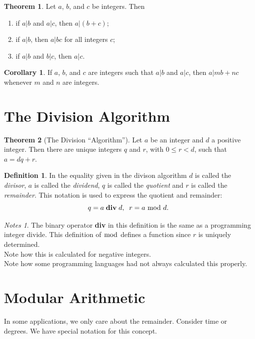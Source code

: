 \documentclass[11pt]{book} %
\theoremstyle {definition}
\newtheorem {definition}{Definition}[section]
\newtheorem {theorem}{Theorem}[section]
\newtheorem {corollary}{Corollary}[section]
\theoremstyle {remark}
\newtheorem*{notes}{Notes}
\begin{document}
\begin{theorem}
Let $a$, $b$, and $c$ be integers. Then 
\begin{enumerate}
\item if $a \vert b$ and $a \vert c$, then $a \vert (b+c)$;
\item if $a \vert b$, then $a \vert bc$ for all integers $c$;
\item if $a \vert b$ and $b \vert c$, then $a \vert c$.
\end{enumerate}
\end{theorem}

\begin{corollary}
If $a$, $b$, and $c$ are integers such that $a \vert b$ and $a \vert c$, then $a \vert mb+nc$ whenever $m$ and $n$ are integers.
\end{corollary}


\section {The Division Algorithm}
\begin {theorem} [The Division ``Algorithm'']  Let $a$ be an integer and $d$ a positive integer. Then there are unique integers $q$ and $r$, with $0 \leq r < d$, such that $a=dq+r$.
\end {theorem}


\begin {definition}
In the equality given in the divison algorithm $d$ is called the \textit{divisor}, $a$ is called the \textit{dividend}, $q$ is called the \textit{quotient} and $r$ is called the \textit{remainder}. This notation is used to express the quotient and remainder:
     $$ q=a\; \mathbf{div} \;d, \;\;   r=a\; \mathbf{\bmod}\; d. $$
\end {definition}

\begin{notes}
The binary operator \textbf{div} in this definition is the same as a programming integer divide. 
This definition of $\bmod$ defines a function since $r$ is uniquely determined.\\ 
Note how this is calculated for negative integers.\\
Note how some programming languages had not always calculated this properly.
\end{notes}

\section {Modular Arithmetic}
In some applications, we only care about the remainder. Consider time or degrees. We have special notation for this concept.
\end{document}
